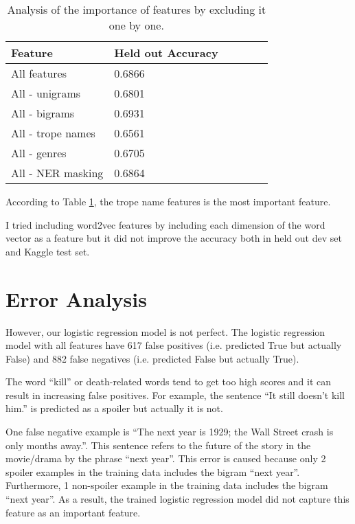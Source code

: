 \documentclass[11pt]{article}
\begin{document}
\begin{table}[h]
  \centering
  \begin{tabular}{|l|l|r|r|r|r|}
  \hline \bf Feature        & \bf Held out Accuracy     \\ \hline
   All features             & 0.6866 \\ \hline
   All - unigrams           & 0.6801 \\ \hline
   All - bigrams            & 0.6931 \\ \hline
   All - trope names        & 0.6561 \\ \hline
   All - genres             & 0.6705 \\ \hline
   All - NER masking        & 0.6864 \\ \hline
  \end{tabular}
  \caption{\label{feature_importance}Analysis of the importance of features by excluding it one by one.}
\end{table}

According to Table \ref{feature_importance}, the trope name features is the most important feature. 

I tried including word2vec features by including each dimension of the word vector as a feature but it did not improve the accuracy both in held out dev set and Kaggle test set. 


\section{Error Analysis}
However, our logistic regression model is not perfect. The logistic regression model with all features have 617 false positives (i.e. predicted True but actually False) and 882 false negatives (i.e. predicted False but actually True).


The word ``kill'' or death-related words tend to get too high scores and it can result in increasing false positives. For example, the sentence ``It still doesn't kill him.'' is predicted as a spoiler but actually it is not. 

One false negative example is ``The next year is 1929; the Wall Street crash is only months away.''. This sentence refers to the future of the story in the movie/drama by the phrase ``next year''. This error is caused because only 2 spoiler examples in the training data includes the bigram ``next year''. Furthermore, 1 non-spoiler example in the training data includes the bigram ``next year''. As a result, the trained logistic regression model did not capture this feature as an important feature.





\end{document}

